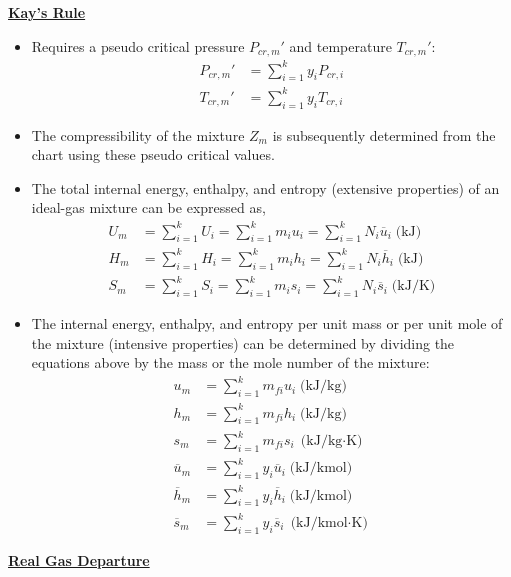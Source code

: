 \Large \textbf{{\color{red}\underline{Kay's Rule}}}

\begin{itemize}
    \item Requires a pseudo critical pressure {\color{blue}$P_{cr,m}'$} and temperature {\color{blue}$T_{cr,m}'$}:
    \begin{align*}
        P_{cr,m}' &= \sum_{i=1}^{k} y_i P_{cr,i} \\
        T_{cr,m}' &= \sum_{i=1}^{k} y_i T_{cr,i}
    \end{align*}
    \item The compressibility of the mixture {\color{blue}$Z_m$} is subsequently determined {\color{blue}from the chart} using these {\color{blue}pseudo critical values.}
    \item The {\color{blue}total internal energy, enthalpy, and entropy} (extensive properties) of an ideal-gas mixture can be expressed as,
    \begin{align*}
        U_m &= \sum_{i=1}^{k} U_i = \sum_{i=1}^k m_i u_i = \sum_{i=1}^k N_i \overline{u}_i \; \text{(kJ)} \\
        H_m &= \sum_{i=1}^k H_i = \sum_{i=1}^k m_i h_i = \sum_{i=1}^k N_i \overline{h}_i \; \text{(kJ)}\\
        S_m &= \sum_{i=1}^k S_i = \sum_{i=1}^k m_i s_i = \sum_{i=1}^k N_i \overline{s}_i \; \text{(kJ/K)}
    \end{align*}
    \item The {\color{blue}internal energy, enthalpy, and entropy per unit mass or per unit mole of the mixture} (intensive properties) can be determined by dividing the equations above by the mass or the mole number of the mixture:
    \begin{align*}
        u_m &= \sum_{i=1}^k m_{fi} u_i \; \text{(kJ/kg)} \\
        h_m &= \sum_{i=1}^k m_{fi} h_i \; \text{(kJ/kg)}\\
        s_m &= \sum_{i=1}^k m_{fi} s_i \; \text{(kJ/kg$\cdot$K)}\\
        \overline{u}_m &= \sum_{i=1}^k y_i \overline{u}_i \; \text{(kJ/kmol)} \\
        \overline{h}_m &= \sum_{i=1}^k y_i \overline{h}_i \; \text{(kJ/kmol)}\\
        \overline{s}_m &= \sum_{i=1}^k y_i \overline{s}_i \; \text{(kJ/kmol$\cdot$K)}
    \end{align*}
\end{itemize}

\Large \textbf{{\color{red}\underline{Real Gas Departure}}}

